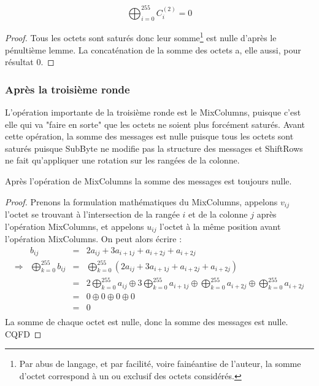 \documentclass[a4paper,11pt]{article}
\begin{document}
\begin{lemma*}
    \begin{displaymath}
        \bigoplus_{i=0}^{255} C_i^{(2)} = 0
    \end{displaymath}
\end{lemma*}

\begin{proof}
    Tous les octets sont saturés donc leur somme\footnote{Par abus de langage, et par facilité,
        voire fainéantise de l'auteur, la somme d'octet correspond à un ou exclusif des octets
    considérés.} est nulle d'après le pénultième lemme. La concaténation de la somme des octets
    a, elle aussi, pour résultat $0$.
\end{proof}

\subsubsection*{Après la troisième ronde}

L'opération importante de la troisième ronde est le MixColumns, puisque c'est elle qui va "faire en
sorte" que les octets ne soient plus forcément saturés. Avant cette opération, la somme des messages
est nulle puisque tous les octets sont saturés puisque SubByte ne modifie pas la structure des
messages et ShiftRows ne fait qu'appliquer une rotation sur les rangées de la colonne.

\begin{thrm*}
    Après l'opération de MixColumns la somme des messages est toujours nulle.
\end{thrm*}

\begin{proof}
    Prenons la formulation mathématiques du MixColumns, appelons $v_{ij}$ l'octet se trouvant à
    l'intersection de la rangée $i$ et de la colonne $j$ après l'opération MixColumns, et appelons
    $u_{ij}$ l'octet à la même position avant l'opération MixColumns. On peut alors écrire :
    \begin{displaymath}
        \begin{array}{rrcl}
            & b_{ij} & = & 2 a_{ij} + 3 a_{i+1 j} + a _{i+2 j} + a_{i+2 j} \\
            \Rightarrow & \bigoplus_{k=0}^{255} b_{ij} & = & \bigoplus_{k=0}^{255} ( 2 a_{ij} + 3 a_{i+1 j} + a _{i+2 j} + a_{i+2 j} )\\
                        & & = & 2 \bigoplus_{k=0}^{255} a_{ij} \oplus 3 \bigoplus_{k=0}^{255} a_{i+1j} \oplus \bigoplus_{k=0}^{255} a_{i+2j} \oplus \bigoplus_{k=0}^{255} a_{i+2j} \\
                        & & = & 0 \oplus 0 \oplus 0 \oplus 0 \\
                        & & = & 0 \\
        \end{array}
    \end{displaymath}
    La somme de chaque octet est nulle, donc la somme des messages est nulle.
    CQFD
\end{proof}
\end{document}
